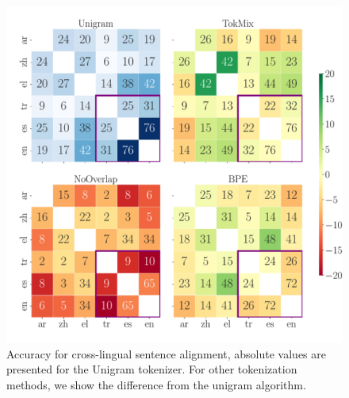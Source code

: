 \begin{figure}[tb!]
    \centering
    \includegraphics[width=1.0\linewidth]{figures/Tatoeba_Acc_transfer_.pdf}
    
    \caption{Accuracy for cross-lingual sentence alignment, absolute values are presented for the Unigram tokenizer. For other tokenization methods, we show  the difference from the unigram algorithm.}
    \label{fig:tatoeba_transfer}
\end{figure}
